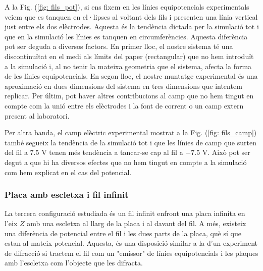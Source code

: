 \documentclass[11pt]{article}
\numberwithin{equation}{section}
\numberwithin{figure}{section}
\numberwithin{table}{section}
\begin{document}
A la Fig. (\ref{fig: fils_pot}), si ens fixem en les línies equipotencials experimentals veiem que es tanquen en el·lipses al voltant dels fils i presenten una línia vertical just entre els dos elèctrodes. Aquesta és la tendència dictada per la simulació tot i que en la simulació les línies es tanquen en circumferències. Aquesta diferència pot ser deguda a diversos factors. En primer lloc, el nostre sistema té una discontinuïtat en el medi als límits del paper (rectangular) que no hem introduït a la simulació i, al no tenir la mateixa geometria que el sistema, afecta la forma de les línies equipotencials. En segon lloc, el nostre muntatge experimental és una aproximació en dues dimensions del sistema en tres dimensions que intentem replicar. Per últim, pot haver altres contribucions al camp que no hem tingut en compte com la unió entre els elèctrodes i la font de corrent o un camp extern present al laboratori.

Per altra banda, el camp elèctric  experimental mostrat a la Fig. (\ref{fig: fils_camp}) també segueix la tendència de la simulació tot i que les línies de camp que surten del fil a $7.5$ V tenen més tendència a tancar-se cap al fil a $-7.5$ V. Això pot ser degut a que hi ha diversos efectes que no hem tingut en compte a la simulació com hem explicat en el cas del potencial. 

\subsubsection{Placa amb escletxa i fil infinit}\label{sec:lliure}
La tercera configuració estudiada és un fil infinit enfront una placa infinita en l'eix $Z$ amb una escletxa al llarg de la placa i al davant del fil. A més, existeix una diferència de potencial entre el fil i les dues parts de la placa, què sí que estan al mateix potencial. Aquesta, és una disposició similar a la d'un experiment de difracció si tractem el fil com un "emissor" de línies equipotencials i les plaques amb l'escletxa com l'objecte que les difracta.
\end{document}
